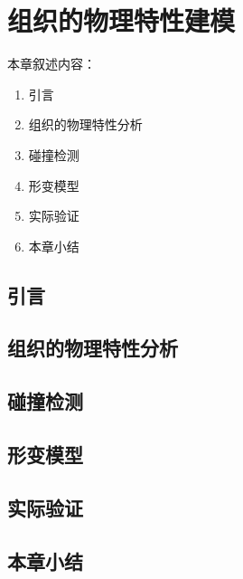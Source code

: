 \chapter{组织的物理特性建模}
\label{chap7}

本章叙述内容：
\begin{enumerate}
  \item 引言
  \item 组织的物理特性分析
  \item 碰撞检测
  \item 形变模型
  \item 实际验证
  \item 本章小结
\end{enumerate}

\section{引言}

\section{组织的物理特性分析}

\section{碰撞检测}

\section{形变模型}

\section{实际验证}

\section{本章小结} 
